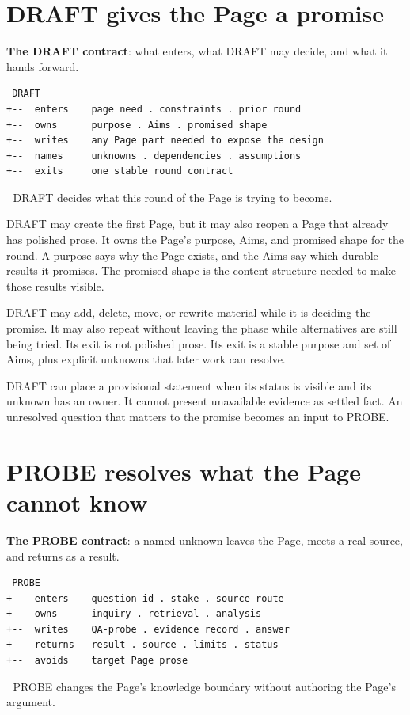 
\section{DRAFT gives the Page a promise}
\textbf{The DRAFT contract}: what enters, what DRAFT may decide, and what it hands forward.

\begin{verbatim}
 DRAFT
+--  enters    page need . constraints . prior round
+--  owns      purpose . Aims . promised shape
+--  writes    any Page part needed to expose the design
+--  names     unknowns . dependencies . assumptions
+--  exits     one stable round contract
\end{verbatim}
📌 DRAFT decides what this round of the Page is trying to become.

DRAFT may create the first Page, but it may also reopen a Page that already has polished prose. It owns the Page's purpose, Aims, and promised shape for the round. A purpose says why the Page exists, and the Aims say which durable results it promises. The promised shape is the content structure needed to make those results visible.

DRAFT may add, delete, move, or rewrite material while it is deciding the promise. It may also repeat without leaving the phase while alternatives are still being tried. Its exit is not polished prose. Its exit is a stable purpose and set of Aims, plus explicit unknowns that later work can resolve.

DRAFT can place a provisional statement when its status is visible and its unknown has an owner. It cannot present unavailable evidence as settled fact. An unresolved question that matters to the promise becomes an input to PROBE.


\section{PROBE resolves what the Page cannot know}
\textbf{The PROBE contract}: a named unknown leaves the Page, meets a real source, and returns as a result.

\begin{verbatim}
 PROBE
+--  enters    question id . stake . source route
+--  owns      inquiry . retrieval . analysis
+--  writes    QA-probe . evidence record . answer
+--  returns   result . source . limits . status
+--  avoids    target Page prose
\end{verbatim}
📌 PROBE changes the Page's knowledge boundary without authoring the Page's argument.

